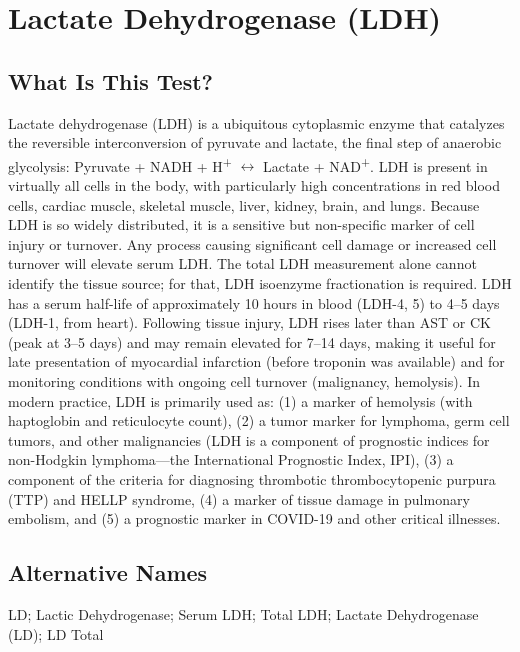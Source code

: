 \chapter{Lactate Dehydrogenase (LDH)}

\section*{What Is This Test?}
Lactate dehydrogenase (LDH) is a ubiquitous cytoplasmic enzyme that catalyzes the reversible interconversion of pyruvate and lactate, the final step of anaerobic glycolysis: Pyruvate + NADH + H\textsuperscript{+} $\leftrightarrow$ Lactate + NAD\textsuperscript{+}. LDH is present in virtually all cells in the body, with particularly high concentrations in red blood cells, cardiac muscle, skeletal muscle, liver, kidney, brain, and lungs. Because LDH is so widely distributed, it is a sensitive but non-specific marker of cell injury or turnover. Any process causing significant cell damage or increased cell turnover will elevate serum LDH. The total LDH measurement alone cannot identify the tissue source; for that, LDH isoenzyme fractionation is required. LDH has a serum half-life of approximately 10 hours in blood (LDH-4, 5) to 4--5 days (LDH-1, from heart). Following tissue injury, LDH rises later than AST or CK (peak at 3--5 days) and may remain elevated for 7--14 days, making it useful for late presentation of myocardial infarction (before troponin was available) and for monitoring conditions with ongoing cell turnover (malignancy, hemolysis). In modern practice, LDH is primarily used as: (1) a marker of hemolysis (with haptoglobin and reticulocyte count), (2) a tumor marker for lymphoma, germ cell tumors, and other malignancies (LDH is a component of prognostic indices for non-Hodgkin lymphoma---the International Prognostic Index, IPI), (3) a component of the criteria for diagnosing thrombotic thrombocytopenic purpura (TTP) and HELLP syndrome, (4) a marker of tissue damage in pulmonary embolism, and (5) a prognostic marker in COVID-19 and other critical illnesses.

\section*{Alternative Names}
LD; Lactic Dehydrogenase; Serum LDH; Total LDH; Lactate Dehydrogenase (LD); LD Total

